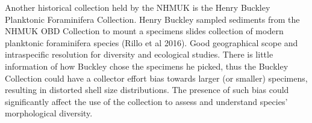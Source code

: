 \documentclass[a4paper]{article}
\begin{document}
Another historical collection held by the NHMUK is the Henry Buckley Planktonic Foraminifera Collection. Henry Buckley sampled sediments from the NHMUK OBD Collection to mount a specimens slides collection of modern planktonic foraminifera species (Rillo et al 2016). Good geographical scope and intraspecific resolution for diversity and ecological studies. 
There is little information of how Buckley chose the specimens he picked, thus the Buckley Collection could have a collector effort bias towards larger (or smaller) specimens, resulting in distorted shell size distributions. 
The presence of such bias could significantly affect the use of the collection to assess and understand species' morphological diversity. 


\end{document}
